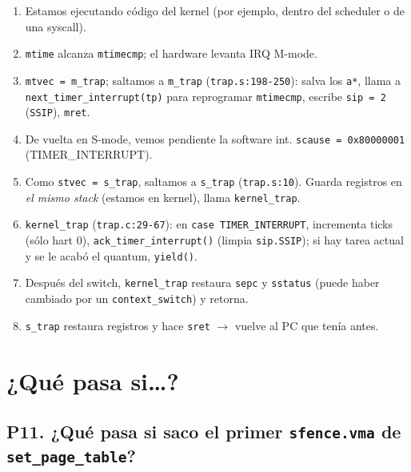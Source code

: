 \documentclass[11pt,a4paper]{article}
\begin{document}
\begin{respuesta}
\begin{enumerate}[leftmargin=*,nosep]
    \item Estamos ejecutando código del kernel (por ejemplo, dentro
        del scheduler o de una syscall).
    \item \texttt{mtime} alcanza \texttt{mtimecmp}; el hardware
        levanta IRQ M-mode.
    \item \texttt{mtvec = m\_trap}; saltamos a \texttt{m\_trap}
        (\texttt{trap.s:198-250}): salva los \texttt{a*}, llama a
        \texttt{next\_timer\_interrupt(tp)} para reprogramar
        \texttt{mtimecmp}, escribe \texttt{sip = 2} (\texttt{SSIP}),
        \texttt{mret}.
    \item De vuelta en S-mode, vemos pendiente la software int.
        \texttt{scause = 0x80000001} (TIMER\_INTERRUPT).
    \item Como \texttt{stvec = s\_trap}, saltamos a
        \texttt{s\_trap} (\texttt{trap.s:10}). Guarda registros en
        \emph{el mismo stack} (estamos en kernel), llama
        \texttt{kernel\_trap}.
    \item \texttt{kernel\_trap} (\texttt{trap.c:29-67}): en
        \texttt{case TIMER\_INTERRUPT}, incrementa ticks (sólo
        hart 0), \texttt{ack\_timer\_interrupt()} (limpia
        \texttt{sip.SSIP}); si hay tarea actual y se le acabó el
        quantum, \texttt{yield()}.
    \item Después del switch, \texttt{kernel\_trap} restaura
        \texttt{sepc} y \texttt{sstatus} (puede haber cambiado por
        un \texttt{context\_switch}) y retorna.
    \item \texttt{s\_trap} restaura registros y hace \texttt{sret}
        $\to$ vuelve al PC que tenía antes.
\end{enumerate}
\end{respuesta}

\section{¿Qué pasa si…?}

\subsection*{P11. ¿Qué pasa si saco el primer \texttt{sfence.vma} de \texttt{set\_page\_table}?}
\end{document}

